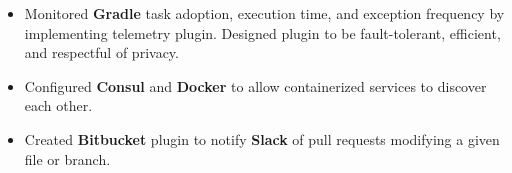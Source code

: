 \begin{itemize}[leftmargin=*]
    \item {
        Monitored \textbf{Gradle} task adoption, execution time, and exception frequency by implementing telemetry plugin. Designed plugin to be fault-tolerant, efficient, and respectful of privacy.
    }
    \item {
        Configured \textbf{Consul} and \textbf{Docker} to allow containerized services to discover each other.
    }
    \item {
        Created \textbf{Bitbucket} plugin to notify \textbf{Slack} of pull requests modifying a given file or branch.
    }
\end{itemize}